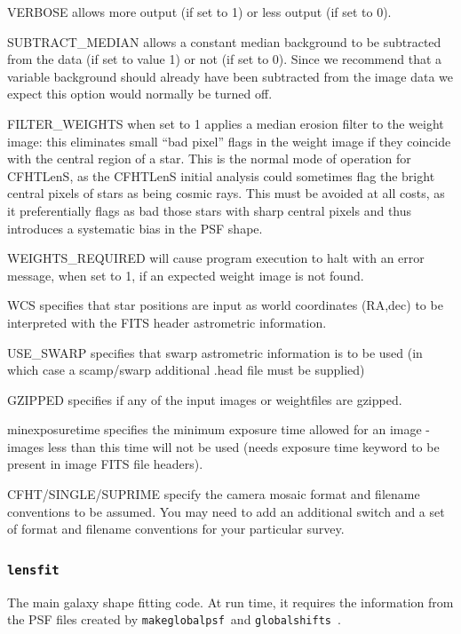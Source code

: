 \documentclass{article}
\def\lensfit{{\tt lensfit}\ }
\def\globalshifts{{\tt globalshifts}\ }
\def\makeglobalpsf{{\tt makeglobalpsf}\ }
\begin{document}
\begin{list}{}{\itemsep=0mm \leftmargin=5mm}
\item VERBOSE allows more output (if set to 1) or less output (if set to 0).
\item SUBTRACT\_MEDIAN allows a constant median background to  be subtracted from the data (if set to 
value 1) or not (if set to 0). Since we recommend that a variable background should already have been 
subtracted from the image data we expect this option would normally be turned off. 
\item FILTER\_WEIGHTS when set to 1 applies a median erosion filter to the weight image: this eliminates
small ``bad pixel'' flags in the weight image if they coincide with the central region of a star.  This
is the normal mode of operation for CFHTLenS, as the CFHTLenS initial analysis could sometimes flag
the bright central pixels of stars as being cosmic rays.  This must be avoided at all costs, as it
preferentially flags as bad those stars with sharp central pixels and thus introduces a systematic
bias in the PSF shape.  
\item WEIGHTS\_REQUIRED will cause program execution to halt with an error message, 
when set to 1, if an expected weight image is not found.
\item WCS specifies that star positions are input as world coordinates (RA,dec) to be interpreted with the 
FITS header astrometric information. 
\item USE\_SWARP specifies that swarp astrometric information is to be used
(in which case a scamp/swarp 
additional .head file must be supplied)
\item GZIPPED specifies if any of the input images or weightfiles are gzipped. 
\item minexposuretime specifies the minimum exposure time allowed for an image - images less than 
this time will not be used (needs exposure time keyword to be present in image FITS file headers).
\item CFHT/SINGLE/SUPRIME specify the camera mosaic format and filename conventions to be assumed.
You may need to add an additional switch and a set of format and filename conventions for your particular survey. 
\end{list}

\subsubsection{\lensfit}
The main galaxy shape fitting code.  At run time, it requires the information from the PSF files created by
\makeglobalpsf and \globalshifts.
\end{document}
